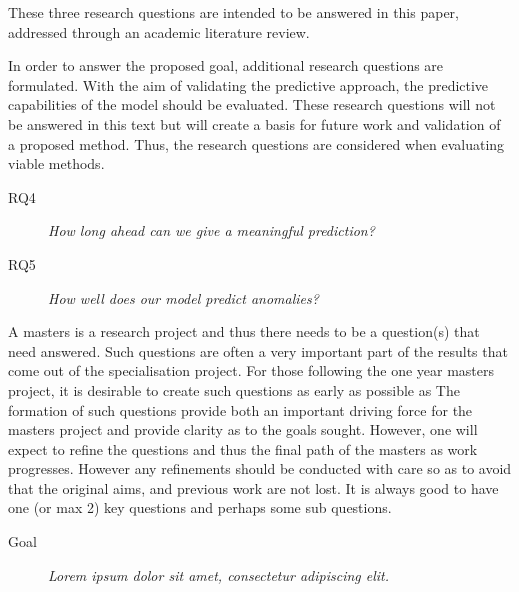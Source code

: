 These three research questions are intended to be answered in this paper, addressed through an academic literature review.
\newline

In order to answer the proposed goal, additional research questions are formulated.
With the aim of validating the predictive approach, the predictive capabilities of the model should be evaluated.
These research questions will not be answered in this text but will create a basis for future work and validation of a proposed method.
Thus, the research questions are considered when evaluating viable methods.

\begin{description}
    \item[RQ4]{\it How long ahead can we give a meaningful prediction?}
\end{description}

\begin{description}
    \item[RQ5]{\it How well does our model predict anomalies?}
\end{description}




\iffalse
    A masters is a research project and thus there needs to be a question(s) that need answered.
    Such questions are often a very important part of the results that come out of the specialisation project.
    For those following the one year masters project, it is desirable to create such questions as early as possible as   The formation of such questions provide both an important driving force for the masters project and provide clarity as to the goals sought. However, one will expect to refine the questions and thus the final path of the masters as work progresses. However any refinements should be conducted with care so as to avoid that the original aims, and previous work are not lost.
    It is always good to have one (or max 2) key questions and perhaps some sub questions.

    \begin{description}
        \item[Goal] {\it Lorem ipsum dolor sit amet, consectetur adipiscing elit.}
    \end{description}

